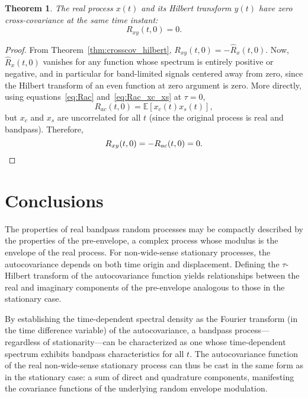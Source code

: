 \documentclass[12pt]{article}
\newtheorem{theorem}{Theorem}[section]
\begin{document}
\begin{theorem}
\label{thm:zero_crosscov}
The real process $x(t)$ and its Hilbert transform $y(t)$ have zero cross-covariance at the same time instant:
\begin{equation}
R_{xy}(t, 0) = 0.
\label{eq:zero_crosscov}
\end{equation}
\end{theorem}
\begin{proof}
From Theorem~\ref{thm:crosscov_hilbert}, $R_{xy}(t, 0) = -\hat{R}_x(t, 0)$. Now, $\hat{R}_x(t, 0)$ vanishes for any function whose spectrum is entirely positive or negative, and in particular for band-limited signals centered away from zero, since the Hilbert transform of an even function at zero argument is zero. More directly, using equations~\eqref{eq:Rac} and~\eqref{eq:Rac_xc_xs} at $\tau = 0$,
\[
R_{ac}(t, 0) = \mathbb{E}[x_c(t)x_s(t)],
\]
but $x_c$ and $x_s$ are uncorrelated for all $t$ (since the original process is real and bandpass).
Therefore,
\[
R_{xy}(t, 0) = -R_{ac}(t, 0) = 0. \qedhere
\]
\end{proof}

\section{Conclusions}
The properties of real bandpass random processes may be compactly described by the properties of the pre-envelope, a complex process whose modulus is the envelope of the real process. For non-wide-sense stationary processes, the autocovariance depends on both time origin and displacement. Defining the $\tau$-Hilbert transform of the autocovariance function yields relationships between the real and imaginary components of the pre-envelope analogous to those in the stationary case.

By establishing the time-dependent spectral density as the Fourier transform (in the time difference variable) of the autocovariance, a bandpass process—regardless of stationarity—can be characterized as one whose time-dependent spectrum exhibits bandpass characteristics for all $t$. The autocovariance function of the real non-wide-sense stationary process can thus be cast in the same form as in the stationary case: a sum of direct and quadrature components, manifesting the covariance functions of the underlying random envelope modulation.
\end{document}
